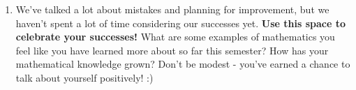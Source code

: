 \documentclass[10pt]{article}
\begin{document}
\begin{enumerate}


















\newpage%
    
\item We've talked a lot about mistakes and planning for improvement, but we haven't spent a lot of time considering our successes yet. {\bf Use this space to celebrate your successes!} What are some examples of mathematics you feel like you have learned more about so far this semester? How has your mathematical knowledge grown? Don't be modest - you've earned a chance to talk about yourself positively! :)


\end{enumerate}
\end{document}
